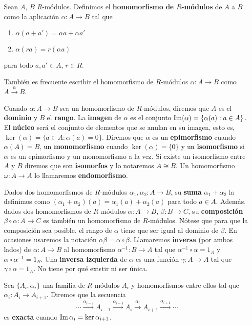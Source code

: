 \begin{definicion}
	Sean $A$, $B$ $R$-módulos. Definimos el \textbf{homomorfismo de $R$-módulos} de $A$ a $B$ como la aplicación $\alpha: A \rightarrow B$ tal que
	\begin{enumerate}
		\item $\alpha(a+a') = \alpha a + \alpha a'$
		\item $\alpha(ra) = r(\alpha a)$
	\end{enumerate}
	para todo $a,a' \in A$, $r \in R$.
\end{definicion}

También es frecuente escribir el homomorfismo de $R$-módulos $\alpha: A \rightarrow B$ como $A \xrightarrow{\alpha} B$.

Cuando $\alpha: A \rightarrow B$ sea un homomorfismo de $R$-módulos, diremos que $A$ es el \textbf{dominio} y $B$ el \textbf{rango}. La \textbf{imagen} de $\alpha$ es el conjunto $\operatorname{Im}(\alpha) = \{ \alpha(a) : a \in A \}$. El \textbf{núcleo} será el conjunto de elementos que se anulan en su imagen, esto es, $\ker(\alpha) = \{ a \in A : \alpha(a) = 0 \}$. Diremos que $\alpha$ es un \textbf{epimorfismo} cuando $\alpha(A) = B$, un \textbf{monomorfismo} cuando $\ker(\alpha) = \{0\}$ y un \textbf{isomorfismo} si $\alpha$ es un epimorfismo y un monomorfismo a la vez. Si existe un isomorfismo entre $A$ y $B$ diremos que son \textbf{isomorfos} y lo notaremos $A \cong B$. Un homomorfismo $\omega: A \rightarrow A$ lo llamaremos \textbf{endomorfismo}.

Dados dos homomorfismos de $R$-módulos $\alpha_1, \alpha_2 : A \rightarrow B$, su \textbf{suma} $\alpha_1 + \alpha_2$ la definimos como $(\alpha_1 + \alpha_2)(a) = \alpha_1(a) + \alpha_2(a)$ para todo $a \in A$. Además, dados dos homomorfismos de $R$-módulos $\alpha: A \rightarrow B$, $\beta: B \rightarrow C$, su \textbf{composición} $\beta \circ \alpha: A \rightarrow C$ es también un homomorfismo de $R$-módulos. Nótese que para que la composición sea posible, el rango de $\alpha$ tiene que ser igual al dominio de $\beta$. En ocasiones usaremos la notación $\alpha\beta = \alpha \circ \beta$. Llamaremos \textbf{inversa} (por ambos lados) de $\alpha : A \rightarrow B$ al homomorfismo $\alpha^{-1} : B \rightarrow A$ tal que $\alpha^{-1} \circ \alpha = 1_A$ y $\alpha \circ \alpha^{-1} = 1_B$. Una \textbf{inversa izquierda} de $\alpha$ es una función $\gamma: A \rightarrow A$ tal que $\gamma \circ \alpha = 1_A$. No tiene por qué existir ni ser única.

\begin{definicion}
	Sea $\{A_i, \alpha_i\}$ una familia de $R$-módulos $A_i$ y homomorfismos entre ellos tal que $\alpha_i: A_i \rightarrow A_{i+1}$. Diremos que la secuencia
	\[ \cdots \xrightarrow{\alpha_{i-2}} A_{i-1} \xrightarrow{\alpha_{i-1}} A_i \xrightarrow{\alpha_{i}} A_{i+1} \xrightarrow{\alpha_{i+1}} \cdots \]
	es \textbf{exacta} cuando $\operatorname{Im} \alpha_i = \ker \alpha_{i+1}$.
\end{definicion}

